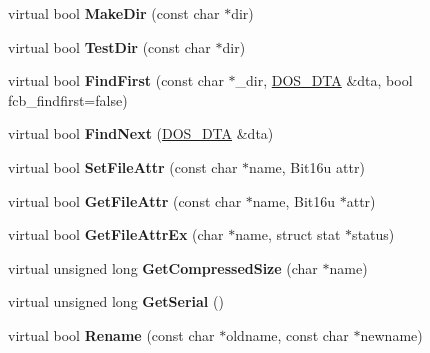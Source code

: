 \begin{DoxyCompactItemize}
\item 
\hypertarget{classfatDrive_a3529c8adc85f6c6a1d8c2fd4156bcbae}{virtual bool {\bfseries Make\-Dir} (const char $\ast$dir)}\label{classfatDrive_a3529c8adc85f6c6a1d8c2fd4156bcbae}

\item 
\hypertarget{classfatDrive_a3be370f09c1c3a5c88381b86d180c627}{virtual bool {\bfseries Test\-Dir} (const char $\ast$dir)}\label{classfatDrive_a3be370f09c1c3a5c88381b86d180c627}

\item 
\hypertarget{classfatDrive_ae6a1a651216a72b1aa23172aca4793db}{virtual bool {\bfseries Find\-First} (const char $\ast$\-\_\-dir, \hyperlink{classDOS__DTA}{D\-O\-S\-\_\-\-D\-T\-A} \&dta, bool fcb\-\_\-findfirst=false)}\label{classfatDrive_ae6a1a651216a72b1aa23172aca4793db}

\item 
\hypertarget{classfatDrive_aa42a5640691796f7d1fef063b92dc418}{virtual bool {\bfseries Find\-Next} (\hyperlink{classDOS__DTA}{D\-O\-S\-\_\-\-D\-T\-A} \&dta)}\label{classfatDrive_aa42a5640691796f7d1fef063b92dc418}

\item 
\hypertarget{classfatDrive_a1376620951f4411b32b604eeefd77d4c}{virtual bool {\bfseries Set\-File\-Attr} (const char $\ast$name, Bit16u attr)}\label{classfatDrive_a1376620951f4411b32b604eeefd77d4c}

\item 
\hypertarget{classfatDrive_a5849a5af82e7d7a273e6096aa08d220b}{virtual bool {\bfseries Get\-File\-Attr} (const char $\ast$name, Bit16u $\ast$attr)}\label{classfatDrive_a5849a5af82e7d7a273e6096aa08d220b}

\item 
\hypertarget{classfatDrive_abc413920b854f692ff21056d34f5a9e8}{virtual bool {\bfseries Get\-File\-Attr\-Ex} (char $\ast$name, struct stat $\ast$status)}\label{classfatDrive_abc413920b854f692ff21056d34f5a9e8}

\item 
\hypertarget{classfatDrive_a129d59e6d37174a27fe550233ac84d90}{virtual unsigned long {\bfseries Get\-Compressed\-Size} (char $\ast$name)}\label{classfatDrive_a129d59e6d37174a27fe550233ac84d90}

\item 
\hypertarget{classfatDrive_a0f9179e5fdfa11777226bc80ad33fddb}{virtual unsigned long {\bfseries Get\-Serial} ()}\label{classfatDrive_a0f9179e5fdfa11777226bc80ad33fddb}

\item 
\hypertarget{classfatDrive_a280a53447052bc89d35e281e3180c281}{virtual bool {\bfseries Rename} (const char $\ast$oldname, const char $\ast$newname)}\label{classfatDrive_a280a53447052bc89d35e281e3180c281}


\end{DoxyCompactItemize}
